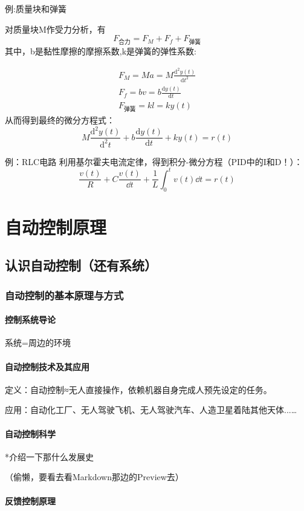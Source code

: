 \documentclass{NHNotebook}
\begin{document}
例:质量块和弹簧

对质量块M作受力分析，有$$F_{\displaystyle{\mbox{合力}}}=F_{M}+F_{f}+F_{\mbox{弹簧}}$$
其中，b是黏性摩擦的摩擦系数,k是弹簧的弹性系数:

\begin{gather*}
    F_{M}=Ma=M \frac{\mathrm{d}^2y(t)}{\mathrm{d}t^2}\\
    F_f=bv=b\frac{\mathrm{d}y(t)}{\mathrm{d}t}\\
    F_{\mbox{弹簧}}=kl=ky(t)
\end{gather*}
从而得到最终的微分方程式：
\[
   M\frac{\mathrm{d}^2y(t)}{\mathrm{d}^2t}+b\frac{\mathrm{d}y(t)}{\mathrm{d}t}+ky(t)=r(t)
\]

例：RLC电路
利用基尔霍夫电流定律，得到积分-微分方程（PID中的I和D！）：
\[
    \frac{v(t)}{R}+C\frac{v(t)}{\dd t}+\frac{1}{L}\int_{0}^{t}v(t)\dd t=r(t)   
\]

\part{自动控制原理}
\chapter{认识自动控制（还有系统）}

\section{自动控制的基本原理与方式}
\subsection{控制系统导论}
系统=周边的环境
\subsection{自动控制技术及其应用}
定义：自动控制≈无人直接操作，依赖机器自身完成人预先设定的任务。

应用：自动化工厂、无人驾驶飞机、无人驾驶汽车、人造卫星着陆其他天体...\dots
\subsection{自动控制科学}
*介绍一下那什么发展史

（偷懒，要看去看Markdown那边的Preview去）

\subsection{反馈控制原理}
\end{document}
